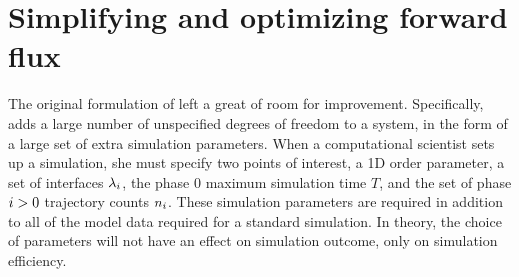 %


\section{Simplifying and optimizing forward flux}
The original formulation of \supercite{Allen:2005wy} left a great of room for improvement. Specifically,  adds a large number of unspecified degrees of freedom to a system, in the form of a large set of extra simulation parameters. When a computational scientist sets up a  simulation, she must specify two points of interest, a 1D order parameter, a set of interfaces ${\lambda}_{i}$, the phase $0$ maximum simulation time $T$, and the set of phase $i>0$ trajectory counts $n_{i}$. These simulation parameters are required in addition to all of the model data required for a standard  simulation. In theory, the choice of  parameters will not have an effect on simulation outcome\supercite{Allen:2009kb}, only on simulation efficiency.

